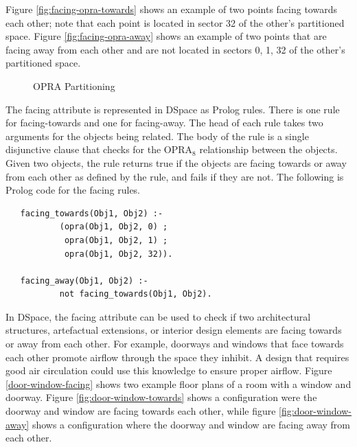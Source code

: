 \documentclass[12pt]{ucthesis}
\begin{document}
Figure \ref{fig:facing-opra-towards} shows an example of two points facing towards each other; note that each point is located in sector 32 of the other's partitioned space.  Figure \ref{fig:facing-opra-away} shows an example of two points that are facing away from each other and are not located in sectors 0, 1, 32 of the other's partitioned space. 

\begin{figure}[H]
 \centering
  \hspace{10 mm}
 \caption{OPRA Partitioning }
\label{opra-facing}
\end{figure}

The facing attribute is represented in DSpace as Prolog rules. There is one rule for facing-towards and one for facing-away. The head of each rule takes two arguments for the objects being related. The body of the rule is a single disjunctive clause that checks for the OPRA$_{8}$ relationship between the objects. Given two objects, the rule returns true if the objects are facing towards or away from each other as defined by the rule, and fails if they are not. The following is Prolog code for the facing rules.

\begin{verbatim}
   facing_towards(Obj1, Obj2) :- 
           (opra(Obj1, Obj2, 0) ;
            opra(Obj1, Obj2, 1) ;
            opra(Obj1, Obj2, 32)).
                                 
   facing_away(Obj1, Obj2) :- 
           not facing_towards(Obj1, Obj2).                     
\end{verbatim}

In DSpace, the facing attribute can be used to check if two architectural structures, artefactual extensions, or interior design elements are facing towards or away from each other. For example, doorways and windows that face towards each other promote airflow through the space they inhibit. A design that requires good air circulation could use this knowledge to ensure proper airflow. Figure \ref{door-window-facing} shows two example floor plans of a room with a window and doorway. Figure \ref{fig:door-window-towards} shows a configuration were the doorway and window are facing towards each other, while figure \ref{fig:door-window-away} shows a configuration where the doorway and window are facing away from each other. 
\end{document}
